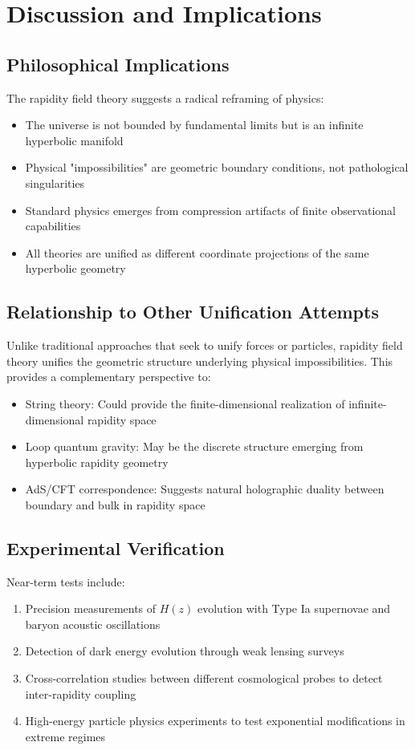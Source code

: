 \documentclass[12pt,a4paper]{article}
\begin{document}
\section{Discussion and Implications}

\subsection{Philosophical Implications}

The rapidity field theory suggests a radical reframing of physics:
\begin{itemize}
    \item The universe is not bounded by fundamental limits but is an infinite hyperbolic manifold
    \item Physical "impossibilities" are geometric boundary conditions, not pathological singularities
    \item Standard physics emerges from compression artifacts of finite observational capabilities
    \item All theories are unified as different coordinate projections of the same hyperbolic geometry
\end{itemize}

\subsection{Relationship to Other Unification Attempts}

Unlike traditional approaches that seek to unify forces or particles, rapidity 
field theory unifies the geometric structure underlying physical impossibilities. 
This provides a complementary perspective to:
\begin{itemize}
    \item String theory: Could provide the finite-dimensional realization of infinite-dimensional rapidity space
    \item Loop quantum gravity: May be the discrete structure emerging from hyperbolic rapidity geometry
    \item AdS/CFT correspondence: Suggests natural holographic duality between boundary and bulk in rapidity space
\end{itemize}

\subsection{Experimental Verification}

Near-term tests include:
\begin{enumerate}
    \item Precision measurements of $H(z)$ evolution with Type Ia supernovae and baryon acoustic oscillations
    \item Detection of dark energy evolution through weak lensing surveys
    \item Cross-correlation studies between different cosmological probes to detect inter-rapidity coupling
    \item High-energy particle physics experiments to test exponential modifications in extreme regimes
\end{enumerate}
\end{document}
